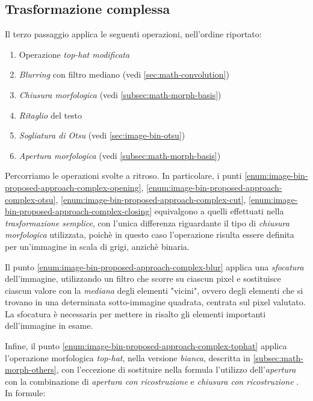 \subsection{Trasformazione complessa}
\label{subsec:image-bin-proposed-approach-complex}
Il terzo passaggio applica le seguenti operazioni, nell'ordine riportato:
\begin{enumerate}
	\item\label{enum:image-bin-proposed-approach-complex-tophat} Operazione \textit{top-hat modificata}
	\item\label{enum:image-bin-proposed-approach-complex-blur} \textit{Blurring} con filtro mediano (vedi \ref{sec:math-convolution})
	\item\label{enum:image-bin-proposed-approach-complex-closing} \textit{Chiusura morfologica} (vedi \ref{subsec:math-morph-basis})
	\item\label{enum:image-bin-proposed-approach-complex-cut} \textit{Ritaglio} del testo
	\item \label{enum:image-bin-proposed-approach-complex-otsu} \textit{Sogliatura di Otsu} (vedi \ref{sec:image-bin-otsu})
	\item\label{enum:image-bin-proposed-approach-complex-opening} \textit{Apertura morfologica} (vedi \ref{subsec:math-morph-basis})
\end{enumerate}
Percorriamo le operazioni svolte a ritroso. In particolare, i punti \ref{enum:image-bin-proposed-approach-complex-opening}, \ref{enum:image-bin-proposed-approach-complex-otsu}, \ref{enum:image-bin-proposed-approach-complex-cut}, \ref{enum:image-bin-proposed-approach-complex-closing} equivalgono a quelli effettuati nella \textit{trasformazione semplice}, con l'unica differenza riguardante il tipo di \textit{chiusura morfologica} utilizzata, poich\`e in questo caso l'operazione risulta essere definita per un'immagine in scala di grigi, anzich\`e binaria.\par
Il punto \ref{enum:image-bin-proposed-approach-complex-blur} applica una \textit{sfocatura} dell'immagine, utilizzando un filtro che scorre su ciascun pixel e sostituisce ciascun valore con la \textit{mediana} degli elementi "vicini", ovvero degli elementi che si trovano in una determinata sotto-immagine quadrata, centrata sul pixel valutato. La sfocatura \`e necessaria per mettere in risalto gli elementi importanti dell'immagine in esame.\par
Infine, il punto \ref{enum:image-bin-proposed-approach-complex-tophat} applica l'operazione morfologica \textit{top-hat}, nella versione \textit{bianca}, descritta in \ref{subsec:math-morph-others}, con l'eccezione di sostituire nella formula l'utilizzo dell'\textit{apertura} con la combinazione di \textit{apertura con ricostruzione} e \textit{chiusura con ricostruzione} \cite{bib:top-hat-paper}. In formule:
